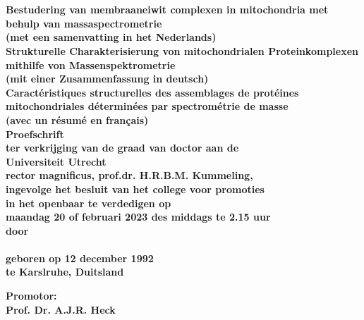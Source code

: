 \begin{titlepage}
    \begin{center}
        {\huge \bfseries \thesistitle \par \ }\\
        [0.5cm]
        {\small \bfseries Bestudering van membraaneiwit complexen in mitochondria met behulp van massaspectrometrie\\
        (met een samenvatting in het Nederlands)}\\
        [0.25cm]
        {\small \bfseries Strukturelle Charakterisierung von mitochondrialen Proteinkomplexen mithilfe von Massenspektrometrie\\
        (mit einer Zusammenfassung in deutsch)}\\
        [0.25cm]
        {\small \bfseries Caractéristiques structurelles des assemblages de protéines mitochondriales déterminées par spectrométrie de masse\\
        (avec un résumé en français)}\\
        [2cm]
        {\Large \bfseries Proefschrift}\\
        \bigskip
        \bigskip
        {\small \bfseries ter verkrijging van de graad van doctor aan de\\
            Universiteit Utrecht\\
            rector magnificus, prof.dr. H.R.B.M. Kummeling,\\
            ingevolge het besluit van het college voor promoties\\
            in het openbaar te verdedigen op\\
            \bigskip
            maandag 20 of februari 2023 des middags te 2.15 uur}\\
        [1cm]
        {\small \bfseries door}\\
        [1cm]

        {\large \bfseries\name\\
        \smallskip
        \small geboren op 12 december 1992\\
        te Karslruhe, Duitsland}

    \end{center}

    \clearpage

    \begin{flushleft}
        {\bfseries Promotor:\\
            \small Prof. Dr. A.J.R. Heck}
    \end{flushleft}

\end{titlepage}
